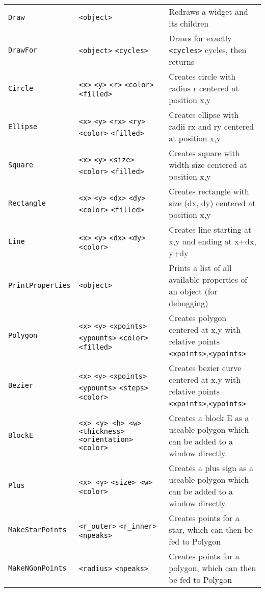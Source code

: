 \begin{longtable}{p{3cm}p{3cm}p{6cm}}
\verb+Draw+ &\verb+<object>+ &Redraws a widget and its children\\ 
\verb+DrawFor+ &\verb+<object>+ \verb+<cycles>+ &Draws for exactly \verb+<cycles>+ cycles, then returns\\ 
\verb+Circle+ &\verb+<x>+ \verb+<y>+ \verb+<r>+  \verb+<color>+ \verb+<filled>+&Creates circle with radius r centered at position x,y\\ 
\verb+Ellipse+ &\verb+<x>+ \verb+<y>+ \verb+<rx>+ \verb+<ry>+\verb+<color>+ \verb+<filled>+&Creates ellipse with radii rx and ry centered at position x,y\\ 
\verb+Square+ &\verb+<x>+ \verb+<y>+ \verb+<size>+ \verb+<color>+ \verb+<filled>+&Creates square with width size centered at position x,y\\ 
\verb+Rectangle+ &\verb+<x>+ \verb+<y>+ \verb+<dx>+ \verb+<dy>+\verb+<color>+ \verb+<filled>+ &Creates rectangle with size (dx, dy) centered at position x,y\\ 
\verb+Line+ &\verb+<x>+ \verb+<y>+ \verb+<dx>+ \verb+<dy>+  \verb+<color>+ &Creates line starting at x,y and ending at x+dx, y+dy\\ 
\verb+PrintProperties+ &\verb+<object>+ &Prints a list of all available properties of an object (for debugging)\\
\verb+Polygon+ &\verb+<x>+ \verb+<y>+ \verb+<xpoints>+ \verb+<ypounts>+  \verb+<color>+\verb+<filled>+ &Creates polygon centered at x,y with relative points \verb+<xpoints>+,\verb+<ypoints>+\\ 
\verb+Bezier+ &\verb+<x>+ \verb+<y>+ \verb+<xpoints>+ \verb+<ypounts>+ \verb+<steps>+ \verb+<color>+ &Creates bezier curve centered at x,y with relative points \verb+<xpoints>+,\verb+<ypoints>+\\ 
\verb+BlockE+         &\verb+<x> <y> <h> <w>+ \verb+<thickness>+ \verb+<orientation>+ \verb+<color>+ &Creates a block E as a useable polygon which can be added to a window directly.\\ 
\verb+Plus+           &\verb+<x> <y>+ \verb+<size> <w>+ \verb+<color>+
&Creates a plus sign as a useable polygon which can be added to a window directly.\\ 
\verb+MakeStarPoints+ &\verb+<r_outer>+ \verb+<r_inner>+ \verb+<npeaks>+ &Creates points for a star, which can then be fed to Polygon\\ 
\verb+MakeNGonPoints+ &\verb+<radius>+ \verb+<npeaks>+ &Creates points for a polygon, which can then be fed to Polygon\\ 




\end{longtable}
